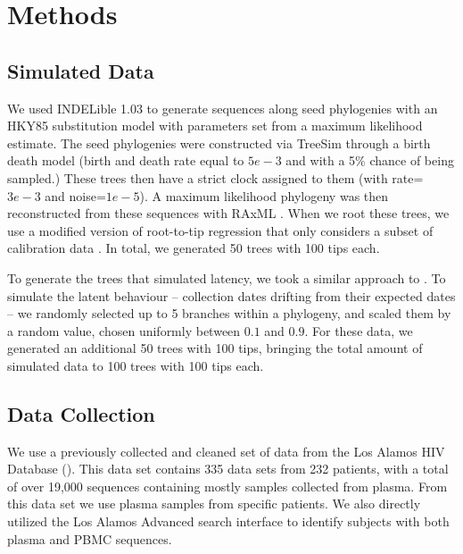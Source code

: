 \section{Methods} \label{sec:methods}

\subsection{Simulated Data} \label{subsec:simdata}
We used INDELible 1.03 \citep{Indelible09} to generate sequences along seed phylogenies with an HKY85 \citep{HKY85} substitution model with parameters set from a maximum likelihood estimate. The seed phylogenies were constructed via TreeSim \citep{TreeSim, Stradler13, Boskova14} through a birth death model (birth and death rate equal to $5e-3$ and with a 5\% chance of being sampled.) These trees then have a strict clock assigned to them (with rate=$3e-3$ and noise=$1e-5$). A maximum likelihood phylogeny was then reconstructed from these sequences with RAxML \citep{Raxml14}. When we root these trees, we use a modified version of root-to-tip regression that only considers a subset of calibration data \citep{APE}. In total, we generated 50 trees with 100 tips each. 

To generate the trees that simulated latency, we took a similar approach to \cite{Immonen14}. To simulate the latent behaviour -- collection dates drifting from their expected dates -- we randomly selected up to 5 branches within a phylogeny, and scaled them by a random value, chosen uniformly between $0.1$ and $0.9$. For these data, we generated an additional 50 trees with 100 tips, bringing the total amount of simulated data to 100 trees with 100 tips each. 

\subsection{Data Collection} \label{subsec:dcollection}
We use a previously collected and cleaned set of data \citep{McCloskey14} from the Los Alamos HIV Database (). This data set contains 335 data sets from 232 patients, with a total of over 19,000 sequences \citep{McCloskey14} containing mostly samples collected from plasma. From this data set we use  plasma samples from  specific patients. We also directly utilized the Los Alamos Advanced search interface \citep{LosAlamos} to identify subjects with both plasma and PBMC sequences.

